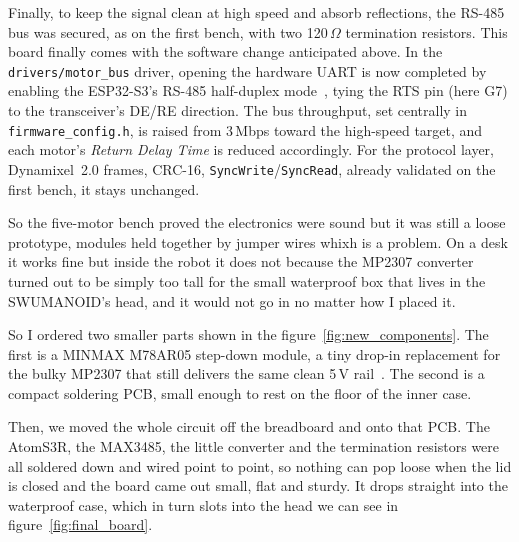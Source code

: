 \documentclass{tropLaClasse}
\begin{document}
Finally, to keep the signal clean at high speed and absorb reflections, the RS-485 bus was secured, as on the first bench, with two 120\,$\Omega$ termination resistors. This board finally comes with the software change anticipated above. In the \texttt{drivers/motor\_bus} driver, opening the hardware UART is now completed by enabling the ESP32-S3's RS-485 half-duplex mode~\cite{esp32s3_uart}, tying the RTS pin (here G7) to the transceiver's DE/RE direction. The bus throughput, set centrally in \texttt{firmware\_config.h}, is raised from 3\,Mbps toward the high-speed target, and each motor's \textit{Return Delay Time} is reduced accordingly. For the protocol layer, Dynamixel~2.0 frames, CRC-16, \texttt{SyncWrite}/\texttt{SyncRead}, already validated on the first bench, it stays unchanged.

So the five-motor bench proved the electronics were sound but it was still a loose prototype, modules held together by jumper wires whixh is a problem. On a desk it works fine but inside the robot it does not because the MP2307 converter turned out to be simply too tall for the small waterproof box that lives in the SWUMANOID's head, and it would not go in no matter how I placed it.

So I ordered two smaller parts shown in the figure~\ref{fig:new_components}. The first is a MINMAX M78AR05 step-down module, a tiny drop-in replacement for the bulky MP2307 that still delivers the same clean 5\,V rail~\cite{minmax_m78ar05}. The second is a compact soldering PCB, small enough to rest on the floor of the inner case. \label{text:new_components}



Then, we moved the whole circuit off the breadboard and onto that PCB. The AtomS3R, the MAX3485, the little converter and the termination resistors were all soldered down and wired point to point, so nothing can pop loose when the lid is closed and the board came out small, flat and sturdy. It drops straight into the waterproof case, which in turn slots into the head we can see in figure~\ref{fig:final_board}.
\end{document}
